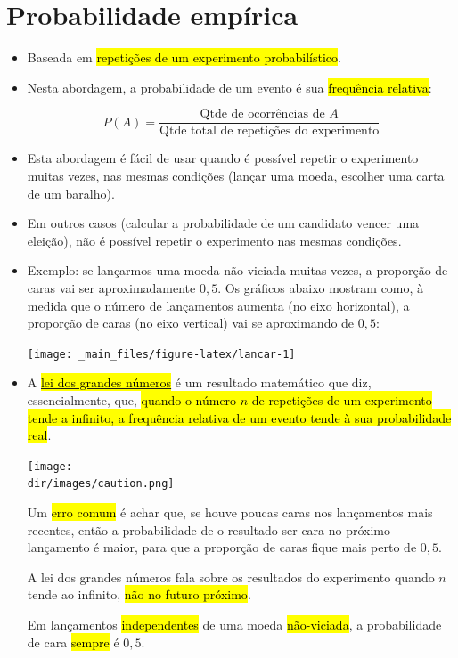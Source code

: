 \documentclass[
  11pt]{report}
\newcommand{\dir}{/ssd/R/x86_64-pc-linux-gnu-library/4.3/fnaufelRmd/rmarkdown/resources}
\newenvironment{rmdcaution}
{
  \begin{mycaution}
    \texttt{[image: \\dir/images/caution.png]}
    \tcblower
  }
  {
  \end{mycaution}
}
\begin{document}
\hypertarget{probabilidade-empuxedrica}{%
\section{Probabilidade empírica}\label{probabilidade-empuxedrica}}

\begin{itemize}
\item
  Baseada em {\hl{repetições de um experimento probabilístico}}.
\item
  Nesta abordagem, a probabilidade de um evento é sua {\hl{frequência relativa}}:

  \[
  P(A) = \frac{\text{Qtde de ocorrências de } A}{\text{Qtde total de repetições do experimento}}
  \]
\item
  Esta abordagem é fácil de usar quando é possível repetir o experimento muitas vezes, nas mesmas condições (lançar uma moeda, escolher uma carta de um baralho).
\item
  Em outros casos (calcular a probabilidade de um candidato vencer uma eleição), não é possível repetir o experimento nas mesmas condições.
\item
  Exemplo: se lançarmos uma moeda não-viciada muitas vezes, a proporção de caras vai ser aproximadamente $0{,}5$. Os gráficos abaixo mostram como, à medida que o número de lançamentos aumenta (no eixo horizontal), a proporção de caras (no eixo vertical) vai se aproximando de $0{,}5$:

  \begin{center}\texttt{[image: \_main\_files/figure-latex/lancar-1]} \end{center}
\item
  A \href{https://pt.wikipedia.org/wiki/Lei_dos_grandes_n\%C3\%BAmeros}{{\hl{lei dos grandes números}}} é um resultado matemático que diz, essencialmente, que, {\hl{quando o número $n$ de repetições de um experimento tende a infinito, a frequência relativa de um evento tende à sua probabilidade real}}.

  \begin{rmdcaution}
  Um {\hl{erro comum}} é achar que, se houve poucas caras nos lançamentos mais recentes, então a probabilidade de o resultado ser cara no próximo lançamento é maior, para que a proporção de caras fique mais perto de $0{,}5$.

  A lei dos grandes números fala sobre os resultados do experimento quando $n$ tende ao infinito, {\hl{não no futuro próximo}}.

  Em lançamentos {\hl{independentes}} de uma moeda {\hl{não-viciada}}, a probabilidade de cara {\hl{sempre}} é $0{,}5$.

  \end{rmdcaution}
\end{itemize}
\end{document}
